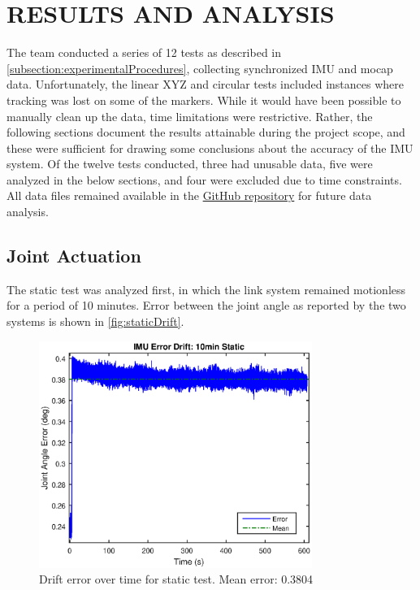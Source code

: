 \documentclass[letterpaper, 10 pt, conference]{ieeeconf}  %
\begin{document}
\section{RESULTS AND ANALYSIS}
The team conducted a series of 12 tests as described in \autoref{subsection:experimentalProcedures}, collecting synchronized IMU and mocap data. Unfortunately, the linear XYZ and circular tests included instances where tracking was lost on some of the markers. While it would have been possible to manually clean up the data, time limitations were restrictive. Rather, the following sections document the results attainable during the project scope, and these were sufficient for drawing some conclusions about the accuracy of the IMU system. Of the twelve tests conducted, three had unusable data, five were analyzed in the below sections, and four were excluded due to time constraints. All data files remained available in the \href{https://github.com/ChrisBove/HandPoseTracking/}{GitHub repository} for future data analysis.

\subsection{Joint Actuation}
The static test was analyzed first, in which the link system remained motionless for a period of 10 minutes. Error between the joint angle as reported by the two systems is shown in \autoref{fig:staticDrift}.

\begin{figure}[thpb]
	\centering
	\includegraphics[width = 3.5in]{static_drift.eps}
    \caption{Drift error over time for static test. Mean error: 0.3804\degree}
    \label{fig:staticDrift}
\end{figure}
\end{document}

